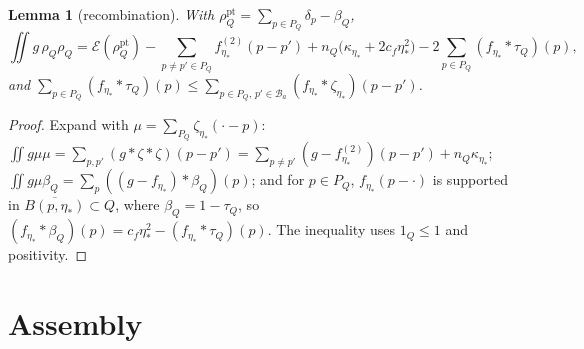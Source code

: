 \documentclass[11pt,reqno]{amsart}
\numberwithin{equation}{section}
\theoremstyle{plain}
\newtheorem{lemma}[theorem]{Lemma}
\theoremstyle{definition}
\newcommand{\cE}{\mathcal{E}}
\begin{document}
\begin{lemma}[recombination]\label{lem:recomb}
With $\rho^{\mathrm{pt}}_Q=\sum_{p\in P_Q}\delta_p-\beta_Q$,
\[
\iint g\,\rho_Q\rho_Q=\cE(\rho^{\mathrm{pt}}_Q)-\!\!\sum_{p\ne p'\in P_Q}\!\!f^{(2)}_{\eta_*}(p-p')+n_Q\big(\kappa_{\eta_*}+2c_f\eta_*^2\big)-2\!\sum_{p\in P_Q}\!(f_{\eta_*}*\tau_Q)(p),
\]
and $\sum_{p\in P_Q}(f_{\eta_*}*\tau_Q)(p)\le\sum_{p\in P_Q,\,p'\in\mathcal B_a}(f_{\eta_*}*\zeta_{\eta_*})(p-p')$.
\end{lemma}
\begin{proof}
Expand with $\mu=\sum_{P_Q}\zeta_{\eta_*}(\cdot-p)$: $\iint g\mu\mu=\sum_{p,p'}(g*\zeta*\zeta)(p-p')=\sum_{p\ne p'}(g-f^{(2)}_{\eta_*})(p-p')+n_Q\kappa_{\eta_*}$; $\iint g\mu\beta_Q=\sum_p((g-f_{\eta_*})*\beta_Q)(p)$; and for $p\in P_Q$, $f_{\eta_*}(p-\cdot)$ is supported in $\overline{B(p,\eta_*)}\subset Q$, where $\beta_Q=1-\tau_Q$, so $(f_{\eta_*}*\beta_Q)(p)=c_f\eta_*^2-(f_{\eta_*}*\tau_Q)(p)$.  The inequality uses $1_Q\le1$ and positivity.
\end{proof}

\section{Assembly}\label{sec:assembly}
\end{document}
